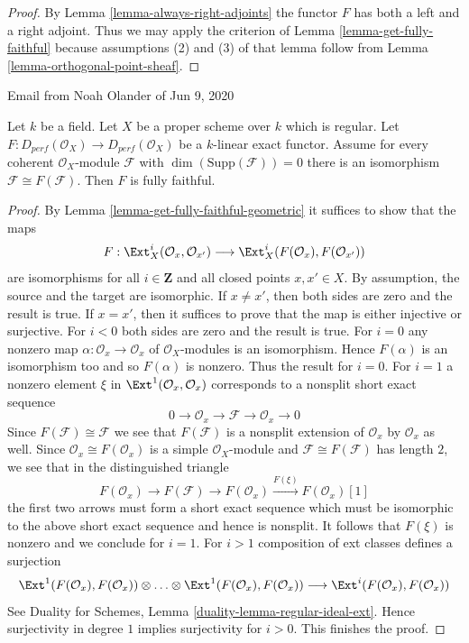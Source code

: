 \begin{proof}
By Lemma \ref{lemma-always-right-adjoints} the functor $F$
has both a left and a right adjoint. Thus we may apply the criterion
of Lemma \ref{lemma-get-fully-faithful}
because assumptions (2) and (3) of that lemma
follow from Lemma \ref{lemma-orthogonal-point-sheaf}.
\end{proof}

\begin{lemma}
\label{lemma-noah-pre}
\begin{reference}
Email from Noah Olander of Jun 9, 2020
\end{reference}
Let $k$ be a field. Let $X$ be a proper scheme over $k$ which is regular.
Let $F : D_{perf}(\mathcal{O}_X) \to D_{perf}(\mathcal{O}_X)$
be a $k$-linear exact functor. Assume for every coherent
$\mathcal{O}_X$-module $\mathcal{F}$ with $\dim(\text{Supp}(\mathcal{F})) = 0$
there is an isomorphism $\mathcal{F} \cong F(\mathcal{F})$.
Then $F$ is fully faithful.
\end{lemma}

\begin{proof}
By Lemma \ref{lemma-get-fully-faithful-geometric} it suffices to show
that the maps
$$
F : \Ext^i_X(\mathcal{O}_x, \mathcal{O}_{x'})
\longrightarrow
\Ext^i_X(F(\mathcal{O}_x), F(\mathcal{O}_{x'}))
$$
are isomorphisms for all $i \in \mathbf{Z}$ and all closed points
$x, x' \in X$. By assumption, the source and the target are isomorphic.
If $x \not = x'$, then both sides are zero and the result is true.
If $x = x'$, then it suffices to prove that the map is either injective
or surjective. For $i < 0$ both sides are zero and the result is true.
For $i = 0$ any nonzero map $\alpha : \mathcal{O}_x \to \mathcal{O}_x$ of
$\mathcal{O}_X$-modules is an isomorphism. Hence $F(\alpha)$ is an
isomorphism too and so $F(\alpha)$ is nonzero. Thus the result for $i = 0$.
For $i = 1$ a nonzero element $\xi$ in $\Ext^1(\mathcal{O}_x, \mathcal{O}_x)$
corresponds to a nonsplit short exact sequence
$$
0 \to \mathcal{O}_x \to \mathcal{F} \to \mathcal{O}_x \to 0
$$
Since $F(\mathcal{F}) \cong \mathcal{F}$ we see that $F(\mathcal{F})$
is a nonsplit extension of $\mathcal{O}_x$ by $\mathcal{O}_x$ as well.
Since $\mathcal{O}_x \cong F(\mathcal{O}_x)$ is a simple
$\mathcal{O}_X$-module and $\mathcal{F} \cong F(\mathcal{F})$ has
length $2$, we see that in the distinguished triangle
$$
F(\mathcal{O}_x) \to F(\mathcal{F}) \to F(\mathcal{O}_x)
\xrightarrow{F(\xi)} F(\mathcal{O}_x)[1]
$$
the first two arrows must form a short exact sequence which must be
isomorphic to the above short exact sequence and hence is nonsplit.
It follows that $F(\xi)$ is nonzero and we conclude for $i = 1$.
For $i > 1$ composition of ext classes defines a surjection
$$
\Ext^1(F(\mathcal{O}_x), F(\mathcal{O}_x)) \otimes \ldots \otimes
\Ext^1(F(\mathcal{O}_x), F(\mathcal{O}_x))
\longrightarrow
\Ext^i(F(\mathcal{O}_x), F(\mathcal{O}_x))
$$
See Duality for Schemes, Lemma \ref{duality-lemma-regular-ideal-ext}.
Hence surjectivity in degree $1$ implies surjectivity for $i > 0$.
This finishes the proof.
\end{proof}










